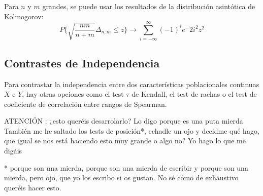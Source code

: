 \documentclass[a4paper,12pt]{article}
\begin{document}
Para $n$ y $m$ grandes, se puede usar los resultados de la distribución asintótica de Kolmogorov:
$$P\{ \sqrt{\frac{nm}{n+m}}\Delta_{n,m}\leq z\}\longrightarrow \sum^{\infty}_{i=-\infty}(-1)^i e^-2i^2z^2$$


\subsection{Contrastes de Independencia}
Para contrastar la independencia entre dos características poblacionales continuas $X$ e $Y$, hay otras opciones como el test $\tau$ de Kendall, el test de rachas o el test de coeficiente de correlación entre rangos de Spearman.

ATENCIÓN : ¿esto queréis desarrolarlo? Lo digo porque es una puta mierda\\
También me he saltado los tests de posición*, echadle un ojo y decidme qué hago, que igual se nos está haciendo esto muy grande o algo no? Yo hago lo que me digáis

* porque son una mierda, porque son una mierda de escribir y porque son una mierda, pero ojo, que yo los escribo si os gustan. No sé cómo de exhaustivo queréis hacer esto.





































\end{document}
